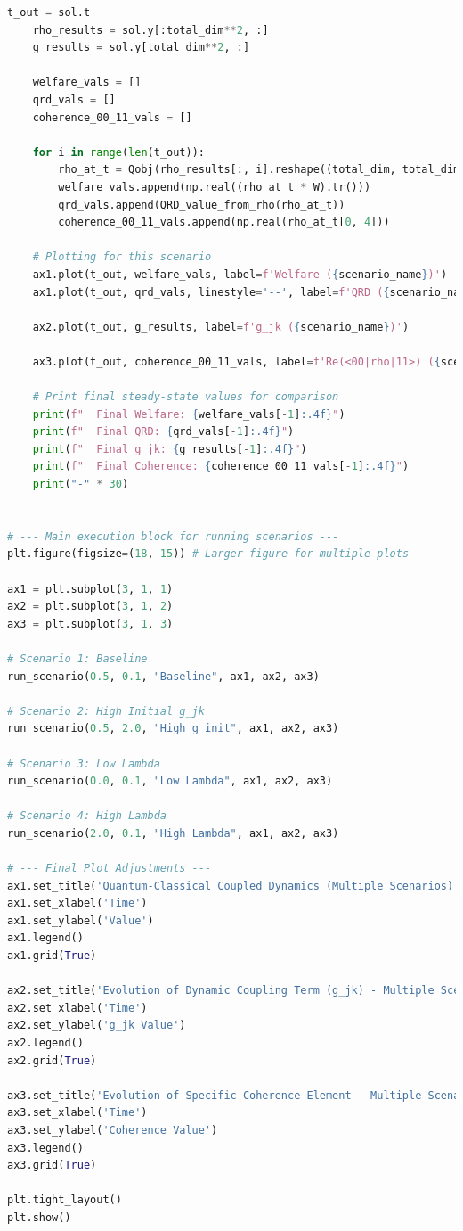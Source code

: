 \documentclass[9pt]{article}
\begin{document}
\begin{lstlisting}[language=Python, basicstyle=\ttfamily\footnotesize, breaklines=true, frame=single, caption={Python Code for Bistability in the Coupled System}, label={lst:qrd_code}]
    t_out = sol.t
    rho_results = sol.y[:total_dim**2, :]
    g_results = sol.y[total_dim**2, :]

    welfare_vals = []
    qrd_vals = []
    coherence_00_11_vals = []

    for i in range(len(t_out)):
        rho_at_t = Qobj(rho_results[:, i].reshape((total_dim, total_dim)), dims=[Ns, Ns])
        welfare_vals.append(np.real((rho_at_t * W).tr()))
        qrd_vals.append(QRD_value_from_rho(rho_at_t))
        coherence_00_11_vals.append(np.real(rho_at_t[0, 4]))

    # Plotting for this scenario
    ax1.plot(t_out, welfare_vals, label=f'Welfare ({scenario_name})')
    ax1.plot(t_out, qrd_vals, linestyle='--', label=f'QRD ({scenario_name})')

    ax2.plot(t_out, g_results, label=f'g_jk ({scenario_name})')
    
    ax3.plot(t_out, coherence_00_11_vals, label=f'Re(<00|rho|11>) ({scenario_name})')

    # Print final steady-state values for comparison
    print(f"  Final Welfare: {welfare_vals[-1]:.4f}")
    print(f"  Final QRD: {qrd_vals[-1]:.4f}")
    print(f"  Final g_jk: {g_results[-1]:.4f}")
    print(f"  Final Coherence: {coherence_00_11_vals[-1]:.4f}")
    print("-" * 30)


# --- Main execution block for running scenarios ---
plt.figure(figsize=(18, 15)) # Larger figure for multiple plots

ax1 = plt.subplot(3, 1, 1)
ax2 = plt.subplot(3, 1, 2)
ax3 = plt.subplot(3, 1, 3)

# Scenario 1: Baseline
run_scenario(0.5, 0.1, "Baseline", ax1, ax2, ax3)

# Scenario 2: High Initial g_jk
run_scenario(0.5, 2.0, "High g_init", ax1, ax2, ax3)

# Scenario 3: Low Lambda
run_scenario(0.0, 0.1, "Low Lambda", ax1, ax2, ax3)

# Scenario 4: High Lambda
run_scenario(2.0, 0.1, "High Lambda", ax1, ax2, ax3)

# --- Final Plot Adjustments ---
ax1.set_title('Quantum-Classical Coupled Dynamics (Multiple Scenarios)')
ax1.set_xlabel('Time')
ax1.set_ylabel('Value')
ax1.legend()
ax1.grid(True)

ax2.set_title('Evolution of Dynamic Coupling Term (g_jk) - Multiple Scenarios')
ax2.set_xlabel('Time')
ax2.set_ylabel('g_jk Value')
ax2.legend()
ax2.grid(True)

ax3.set_title('Evolution of Specific Coherence Element - Multiple Scenarios')
ax3.set_xlabel('Time')
ax3.set_ylabel('Coherence Value')
ax3.legend()
ax3.grid(True)

plt.tight_layout()
plt.show()
\end{lstlisting}
\end{document}
